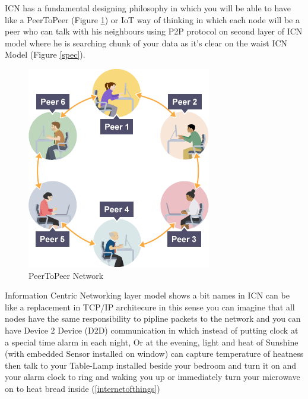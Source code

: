 ICN has a fundamental designing philosophy in which you will be able to have like a PeerToPeer (Figure \ref{peertopeer}) or IoT way of thinking in which each node will be a peer who can talk with his neighbours using P2P protocol on second layer of ICN model where he is searching chunk of your data as it's clear on the waist ICN Model (Figure \ref{spec}). 


\begin{figure}[H]

\begin{center}

\includegraphics[scale = 0.4]{Pictures/peertopeer.png}

\caption{PeerToPeer Network} \label{peertopeer} 

\end{center}

\end{figure}



Information Centric Networking layer model shows a bit names in ICN can be like a replacement in TCP/IP architecure in this sense you can imagine that all nodes have the same responsibility to pipline packets to the network and you can have Device 2 Device (D2D) communication in which instead of putting clock at a special time alarm in each night, Or at the evening, light and heat of Sunshine (with embedded Sensor installed on window) can capture temperature of heatness then talk to your Table-Lamp installed beside your bedroom and turn it on and your alarm clock to ring and waking you up or immediately turn your microwave on to heat bread inside (\ref{internetofthings})



